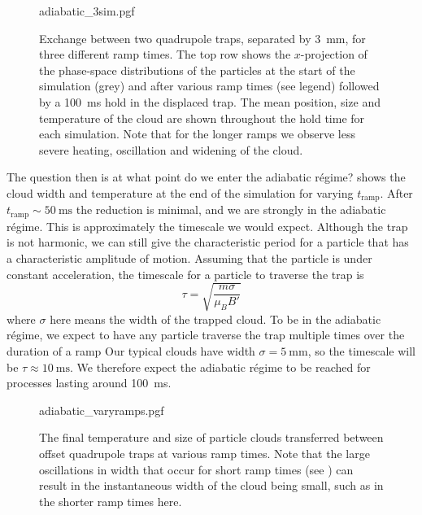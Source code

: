 \begin{figure}[p]
\centering
  {adiabatic_3sim.pgf}
  \caption{
    Exchange between two quadrupole traps, separated by \SI{3}{\milli\meter},
    for three different ramp times. The top row shows the $x$-projection of the
    phase-space distributions of the particles at the start of the simulation
    (grey) and after various ramp times (see legend) followed by a
    \SI{100}{\milli\second} hold in the displaced trap. The mean position, size
    and temperature of the cloud are shown throughout the hold time for each
    simulation. Note that for the longer ramps we observe less severe heating,
    oscillation and widening of the cloud.
  }
  \label{sim:fig:adia3sim}
\end{figure}


The question then is at what point do we enter the adiabatic r\'egime?
 shows the cloud width and temperature at the end
of the simulation for varying $t_\text{ramp}$. After
$t_\text{ramp}\sim\SI{50}{\milli\second}$ the reduction is minimal, and we are
strongly in the adiabatic r\'egime. This is approximately the timescale we
would expect. Although the trap is not harmonic, we can still give the
characteristic period for a particle that has a characteristic amplitude of
motion. Assuming that the particle is under constant acceleration, the
timescale for a particle to traverse the trap is
%
\begin{equation}
  \tau = \sqrt{\frac{m \sigma}{\mu_B B'}}
\end{equation}
%
where $\sigma$ here means the width of the trapped cloud. To be in the
adiabatic r\'egime, we expect to have any particle traverse the trap multiple
times over the duration of a ramp Our typical \CaF{}
clouds
have width $\sigma = \SI{5}{\milli\meter}$, so the timescale will be $\tau
\approx \SI{10}{\milli\second}$. We therefore expect the adiabatic r\'egime to
be reached for processes lasting around \SI{100}{\milli\second}.

\begin{figure}[t!]
\centering
  {adiabatic_varyramps.pgf}
  \caption{
    The final temperature and size of particle clouds transferred between
    offset quadrupole traps at various ramp times. Note that the large
    oscillations in width that occur for short ramp times (see
    ) can result in the instantaneous width of
    the cloud being small, such as in the shorter ramp times here.
  }
  \label{sim:fig:adiavary}
\end{figure}

